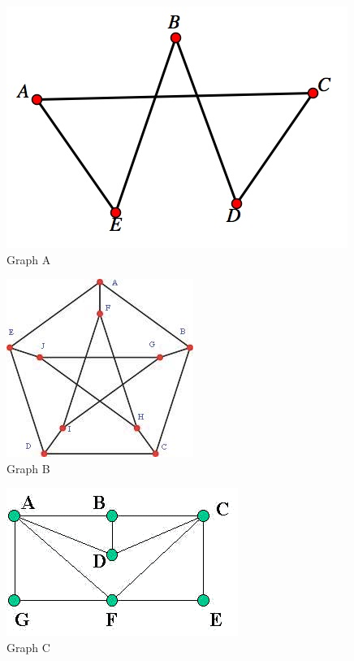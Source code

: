 \documentclass{article}
\theoremstyle{plain}%
\theoremstyle{definition}
\theoremstyle{remark}
\begin{document}
	\begin{figure}[htbp]
		\center
		\includegraphics[scale=0.4]{img/hamilton-graph-a.png}
		\caption{Graph A}
		\label{fig-hamilton-graph-a}
	\end{figure}

	\begin{figure}[htbp]
		\center
		\includegraphics[scale=0.4]{img/hamilton-graph-b.png}
		\caption{Graph B}
		\label{fig-hamilton-graph-b}
	\end{figure}

	\begin{figure}[htbp]
		\center
		\includegraphics[scale=0.4]{img/hamilton-graph-c.png}
		\caption{Graph C}
		\label{fig-hamilton-graph-c}
	\end{figure}
\end{document}
